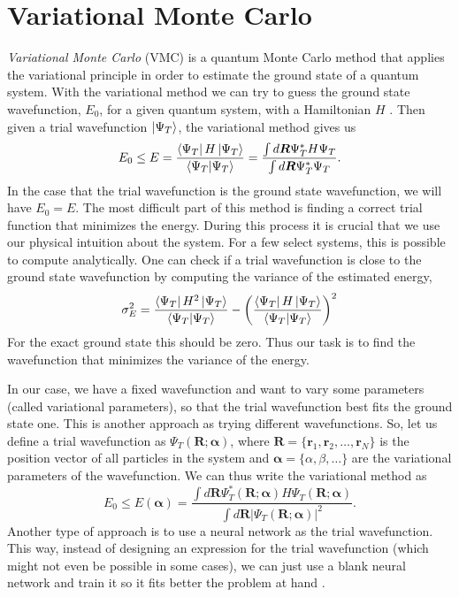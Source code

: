 \documentclass[aps,reprint,superscriptaddress,nofootinbib]{revtex4-2}
\begin{document}
\section*{Variational Monte Carlo}

    \textit{Variational Monte Carlo} (VMC) is a quantum Monte Carlo method that applies the variational principle in order to estimate the ground state of a quantum system. With the variational method we can try to guess the ground state wavefunction, \(E_0\), for a given quantum system, with a Hamiltonian \(H\) \cite{sakurai}. Then given a trial wavefunction \(\ket{\Psi_T}\), the variational method gives us
    \begin{equation} \label{eq:var_method}
        E_0 \leq E = \frac{\bra{\Psi_T} H \ket{\Psi_T}}{\bra{\Psi_T} \ket{\Psi_T}} = \frac{\int d\bm R \Psi_{T}^{*} H \Psi_T}{\int d\bm R \Psi_{T}^{*} \Psi_T}.
    \end{equation}
    In the case that the trial wavefunction is the ground state wavefunction, we will have \(E_0 = E\). The most difficult part of this method is finding a correct trial function that minimizes the energy. During this process it is crucial that we use our physical intuition about the system. For a few select systems, this is possible to compute analytically. One can check if a trial wavefunction is close to the ground state wavefunction by computing the variance of the estimated energy,
    \begin{equation*}
        \sigma^2_E =  \frac{\bra{\Psi_T} H^2 \ket{\Psi_T}}{\bra{\Psi_T} \ket{\Psi_T}}  - \left( \frac{\bra{\Psi_T} H \ket{\Psi_T}}{\bra{\Psi_T} \ket{\Psi_T}} \right)^2
    \end{equation*}
    For the exact ground state this should be zero. Thus our task is to find the wavefunction that minimizes the variance of the energy.
    
    In our case, we have a fixed wavefunction and want to vary some parameters (called variational parameters), so that the trial wavefunction best fits the ground state one. This is another approach as trying different wavefunctions. So, let us define a trial wavefunction as \(\Psi_T(\bm R; \bm \alpha)\), where \(\bm R = \{\bm r_1, \bm r_2, \ldots, \bm r_N \}\) is the position vector of all particles in the system and \(\bm \alpha = \{\alpha, \beta, \ldots \}\) are the variational parameters of the wavefunction. We can thus write the variational method as
    \begin{equation} \label{eq:vmc_use}
        E_0 \leq E(\bm \alpha) = \frac{\int d\bm R \Psi_T^*(\bm R; \bm \alpha) H \Psi_T(\bm R; \bm \alpha)}{\int d\bm R \left| \Psi_T(\bm R; \bm \alpha) \right|^2}.
    \end{equation}
    Another type of approach is to use a neural network as the trial wavefunction. This way, instead of designing an expression for the trial wavefunction (which might not even be possible in some cases), we can just use a blank neural network and train it so it fits better the problem at hand \cite{nn_vmc_nuclei, many_body_ml}.
    
\end{document}
